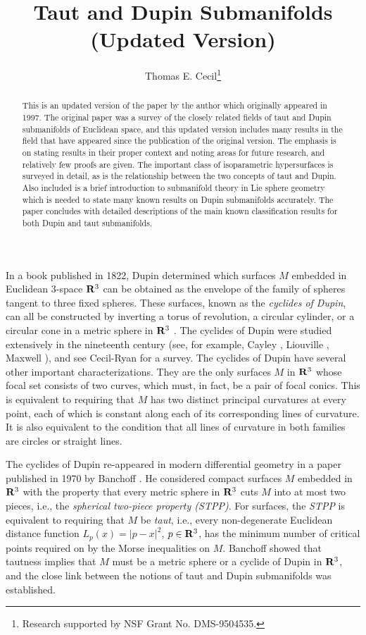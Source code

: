 \documentclass[12pt]{article}
\begin{document}
\title{\bf Taut and Dupin Submanifolds (Updated Version)}
\author{Thomas E. Cecil\thanks{Research supported by NSF
Grant No. DMS-9504535.}}
\maketitle
\begin{abstract}
This is an updated version of the paper \cite{CecMSRI} by the author which originally appeared in 1997.
The original paper was a survey of the closely related fields of taut and
Dupin submanifolds of Euclidean space, and this updated version includes many results in the field that have 
appeared since the publication of the original version. 
The emphasis is on stating
results in their proper context and noting areas for future research, and
relatively few proofs are given. The important class of isoparametric
hypersurfaces is surveyed in detail, as is the relationship between
the two concepts of taut and Dupin.  Also included is a brief introduction to
submanifold theory in Lie sphere geometry which is needed to state
many known results on Dupin submanifolds accurately.  The paper
concludes with detailed descriptions of the main known classification
results for both Dupin and taut submanifolds.  
\end{abstract}

\noindent
In a book published in 1822, Dupin \cite{D} determined which surfaces $M$
embedded in Euclidean 3-space ${\bf R}^3$ can be obtained as the
envelope of the family of spheres tangent to three fixed spheres.
These surfaces, known as the {\em cyclides of Dupin}, can all
be constructed by inverting a torus of revolution, a circular
cylinder, or a circular cone in a metric sphere  in ${\bf R}^3$ .  The cyclides of Dupin
were studied extensively in the nineteenth century (see, for example,
Cayley \cite{Cay}, Liouville \cite{Lio}, Maxwell \cite{Max}), and see Cecil-Ryan \cite[pp. 151--166]{CR7}
for a survey.
The cyclides of Dupin have several other important characterizations.  They
are the only surfaces $M$ in  ${\bf R}^3$ whose focal set consists
of two curves, which must, in fact, be a pair of focal conics.
This is equivalent to requiring that $M$ has two distinct principal
curvatures at every point, each of which is constant along each of its
corresponding lines of curvature.  It is also equivalent to the
condition that all lines of curvature in both families are circles
or straight lines.

The cyclides of Dupin re-appeared in modern differential geometry in a paper
published in 1970 by Banchoff \cite{Ban1}.  He considered 
compact surfaces
$M$ embedded in ${\bf R}^3$ with the property that every metric
sphere in ${\bf R}^3$ cuts $M$ into at most two pieces, i.e.,
the {\em spherical two-piece property (STPP)}.  For surfaces,
the {\em STPP} 
is equivalent to requiring that $M$ be {\em taut}, i.e., every
non-degenerate Euclidean distance function 
$L_p(x) = | p-x |^2$,
$p \in  {\bf R}^3$,
has the minimum number of critical points required on  by
the Morse inequalities on $M$.  Banchoff showed that tautness implies
that $M$ must be a metric sphere or a cyclide of Dupin in ${\bf R}^3$, and the
close link between the notions of taut and Dupin submanifolds was established.
\end{document}
